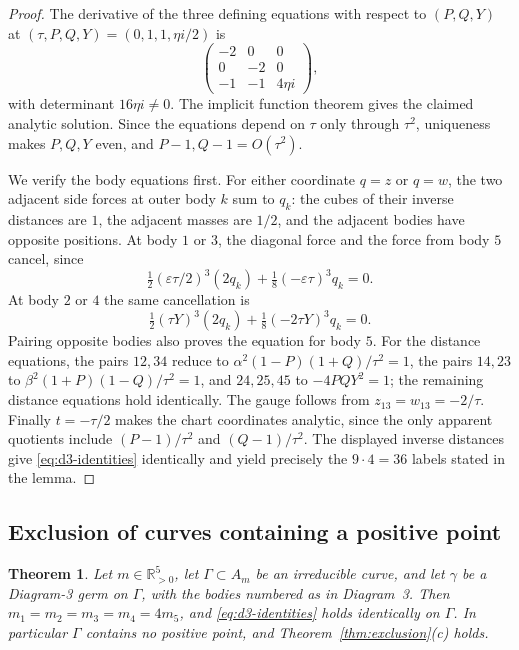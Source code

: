 \documentclass[11pt]{amsart}
\newtheorem{theorem}{Theorem}[section]
\theoremstyle{definition}
\theoremstyle{remark}
\newcommand{\Rp}{\mathbb{R}_{>0}}
\begin{document}
{\begin{proof}
The derivative of the three defining equations with respect to $(P,Q,Y)$ at
$(\tau,P,Q,Y)=(0,1,1,\eta i/2)$ is
\[
 \begin{pmatrix}-2&0&0\\0&-2&0\\-1&-1&4\eta i\end{pmatrix},
\]
with determinant $16\eta i\ne0$. The implicit function theorem gives the
claimed analytic solution. Since the equations depend on $\tau$ only through
$\tau^2$, uniqueness makes $P,Q,Y$ even, and $P-1,Q-1=O(\tau^2)$.

We verify the body equations first. For either coordinate $q=z$ or $q=w$,
the two adjacent side forces at outer body $k$ sum to $q_k$:
the cubes of their inverse distances are $1$, the adjacent masses are $1/2$,
and the adjacent bodies have opposite positions.
At body $1$ or $3$, the diagonal force and the force from body $5$ cancel,
since
\[
 \tfrac12(\varepsilon\tau/2)^3(2q_k)
       +\tfrac18(-\varepsilon\tau)^3q_k=0.
\]
At body $2$ or $4$ the same cancellation is
\[
 \tfrac12(\tau Y)^3(2q_k)+\tfrac18(-2\tau Y)^3q_k=0.
\]
Pairing opposite bodies also proves the equation for body $5$.
For the distance equations, the pairs $12,34$ reduce to
$\alpha^2(1-P)(1+Q)/\tau^2=1$, the pairs $14,23$ to
$\beta^2(1+P)(1-Q)/\tau^2=1$, and $24,25,45$ to $-4PQY^2=1$;
the remaining distance equations hold identically. The gauge follows from
$z_{13}=w_{13}=-2/\tau$.
Finally $t=-\tau/2$ makes the chart coordinates analytic, since the only
apparent quotients include $(P-1)/\tau^2$ and $(Q-1)/\tau^2$.
The displayed inverse distances give \eqref{eq:d3-identities} identically
and yield precisely the $9\cdot4=36$ labels stated in the lemma.
\end{proof}

}\subsection{Exclusion of curves containing a positive point}

\begin{theorem}\label{thm:d3}
Let $m\in\Rp^5$, let $\Gamma\subset A_m$ be an irreducible curve, and let $\gamma$ be a Diagram-3
germ on $\Gamma$, with the bodies numbered as in Diagram~3.  Then $m_1=m_2=m_3=m_4=4m_5$, and
\eqref{eq:d3-identities} holds identically on $\Gamma$.  In particular $\Gamma$ contains no
positive point, and Theorem~\ref{thm:exclusion}(c) holds.
\end{theorem}
\end{document}
